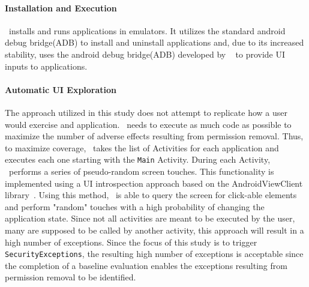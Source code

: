 \paragraph{\bfseries Installation and Execution}
\toolname\ installs and runs applications in emulators.  It utilizes the standard android debug bridge(ADB) to install and uninstall applications and, due to its increased stability, uses the android debug bridge(ADB) developed by ~\cite{Milano} to provide UI inputs to applications.


\paragraph{\bfseries Automatic UI Exploration}
The approach utilized in this study does not attempt to replicate how a user would exercise and application.  \toolname\ needs to execute as much code as possible to maximize the number of adverse effects resulting from permission removal.  Thus, to maximize coverage, \toolname\ takes the list of Activities for each application and executes each one starting with the \texttt{Main} Activity.  During each Activity, \toolname\ performs a series of pseudo-random screen touches.  This functionality is implemented using a UI introspection approach based on the AndroidViewClient library~\cite{Milano}.  Using this method, \toolname\ is able to query the screen for click-able elements and perform "random" touches with a high probability of changing the application state.  Since not all activities are meant to be executed by the user, many are supposed to be called by another activity, this approach will result in a high number of exceptions.  Since the focus of this study is to trigger \texttt{SecurityExceptions}, the resulting high number of exceptions is acceptable since the completion of a baseline evaluation enables the exceptions resulting from permission removal to be identified.      


